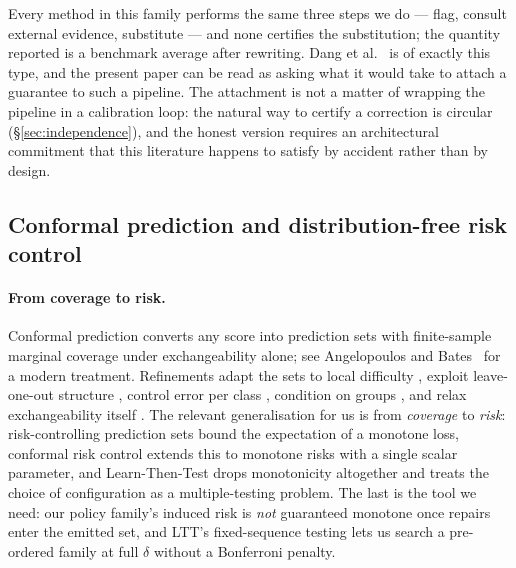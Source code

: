 \documentclass[review,number,doubleblind]{elsarticle}
\theoremstyle{plain}
\theoremstyle{definition}
\theoremstyle{remark}
\begin{document}
Every method in this family performs the same three steps we do --- flag, consult external
evidence, substitute --- and none certifies the substitution; the quantity reported is a
benchmark average after rewriting. Dang et al.~\cite{cmvkgguard} is of exactly this type, and the present
paper can be read as asking what it would take to attach a guarantee to such a pipeline. The
attachment is not a matter of wrapping the pipeline in a calibration loop: the natural way to
certify a correction is circular (\S\ref{sec:independence}), and the honest version requires
an architectural commitment that this literature happens to satisfy by accident rather than by
design.

\subsection{Conformal prediction and distribution-free risk control}
\label{sec:rel:conformal}

\paragraph{From coverage to risk.}
Conformal prediction \citep{vovk2005,papadopoulos2002,lei2018} converts any score into
prediction sets with finite-sample marginal coverage under exchangeability alone; see
Angelopoulos and Bates~\cite{angelopoulos2023gentle} for a modern treatment. Refinements adapt the sets to local
difficulty \citep{romano2019}, exploit leave-one-out structure \citep{barber2021}, control
error per class \citep{sadinle2019,ding2023}, condition on groups
\citep{vovk2003mondrian}, and relax exchangeability itself \citep{barber2023}. The relevant
generalisation for us is from \emph{coverage} to \emph{risk}: risk-controlling prediction sets
\citep{bates2021rcps} bound the expectation of a monotone loss, conformal risk control
\citep{angelopoulos2024crc} extends this to monotone risks with a single scalar parameter, and
Learn-Then-Test \citep{angelopoulos2021ltt} drops monotonicity altogether and treats the choice
of configuration as a multiple-testing problem. The last is the tool we need: our policy
family's induced risk is \emph{not} guaranteed monotone once repairs enter the emitted set,
and LTT's fixed-sequence testing lets us search a pre-ordered family at full $\delta$ without
a Bonferroni penalty.
\end{document}
